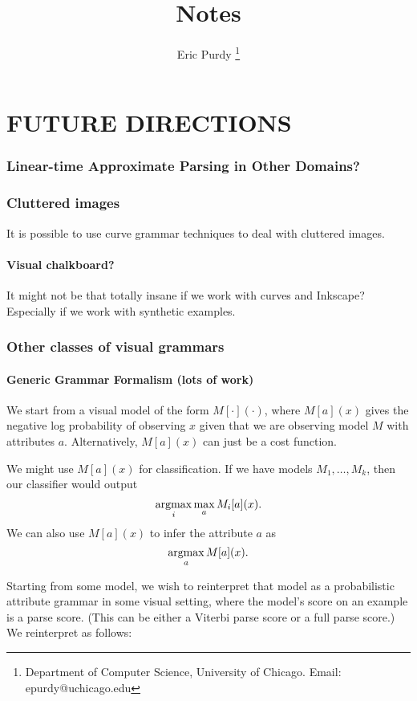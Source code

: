 \documentclass{article}
\title{Notes}
\author{Eric Purdy \footnote{Department of Computer Science, University of Chicago. Email: epurdy@uchicago.edu}}
\begin{document}
\maketitle
\part{FUTURE DIRECTIONS}

\section{Linear-time Approximate Parsing in Other Domains?}

\section{Cluttered images}

It is possible to use curve grammar techniques to deal with cluttered images.

\subsection{Visual chalkboard?}

It might not be that totally insane if we work with curves and
Inkscape? Especially if we work with synthetic examples.

\section{Other classes of visual grammars}

\subsection{Generic Grammar Formalism (lots of work)}

We start from a visual model of the form $M[\cdot](\cdot)$, where
$M[a](x)$ gives the negative log probability of observing $x$ given
that we are observing model $M$ with attributes $a$. Alternatively,
$M[a](x)$ can just be a cost function.

We might use $M[a](x)$ for classification. If we have models $M_1,
\dots, M_k$, then our classifier would output
$$\operatorname*{argmax}_{i} \max_a M_i[a](x).$$
We can also use $M[a](x)$ to infer the attribute $a$ as
$$\operatorname*{argmax}_a M[a](x).$$

Starting from some model, we wish to reinterpret that model as a
probabilistic attribute grammar in some visual setting, where the
model's score on an example is a parse score. (This can be either a
Viterbi parse score or a full parse score.) We reinterpret as follows: 
\end{document}
